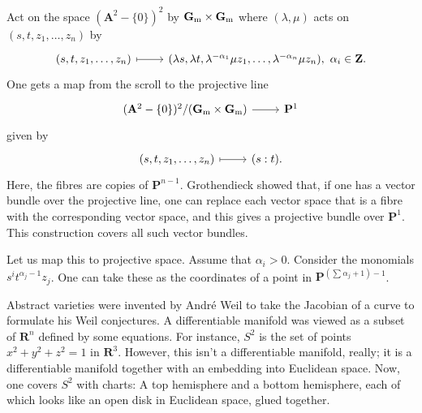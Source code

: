 \documentclass [11 pt, oneside] {article}
\begin{document}
\begin{example}[Scrolls]\label{}
Act on the space $(\mathbf{A}^2-\{0\})^2$ by $\mathbf G\textsubscript{m}\times \mathbf G\textsubscript{m}$ where $(\lambda,\mu)$ acts on $(s,t,z_1,\hdots, z_n)$ by 
\[
\begin{tikzcd}
(s,t,z_1,\hdots,z_n)\ar[r,mapsto]&  (\lambda s, \lambda t, \lambda^{-\alpha_1}\mu z_1,\hdots, \lambda^{-\alpha_n}\mu z_n), \ \alpha_i\in \mathbf{Z}.
\end{tikzcd}
\]
One gets a map from the scroll to the projective line
\[
\begin{tikzcd}
{(\mathbf{A}^2-\{0\})^2}/({\mathbf G\textsubscript{m}\times \mathbf G\textsubscript{m}}) \ar[r]& \mathbf{P}^1
\end{tikzcd}
\]
given by
\[
\begin{tikzcd}
(s,t,z_1,\hdots, z_n) \ar[r,mapsto]& (s:t).
\end{tikzcd}
\]
Here, the fibres are copies of $\mathbf{P}^{n-1}$. Grothendieck showed that, if one has a vector bundle over the projective line,  one can replace each vector space that is a fibre with the corresponding vector space, and this gives a projective bundle over $\mathbf{P}^1$. This construction covers all such vector bundles.

Let us map this to projective space. Assume that $\alpha_i>0$. Consider the monomials $s^it^{\alpha_j-1}z_j$. One can take these as the coordinates of a point in $\mathbf{P}^{\left( \sum_{}^{} \alpha_j+1 \right) - 1}$.
\end{example}

Abstract varieties were invented by Andr\'e Weil to take the Jacobian of a curve to formulate his Weil conjectures. A differentiable manifold was viewed as a subset of $\mathbf{R}^n$ defined by some equations. For instance, $S^2$ is the set of points $x^2+y^2+z^2=1$ in $\mathbf{R}^3$. However, this isn't a differentiable manifold, really; it is a differentiable manifold together with an embedding into Euclidean space. Now, one covers $S^2$ with charts: A top hemisphere and a bottom hemisphere, each of which looks like an open disk in Euclidean space, glued together. 
\end{document}
